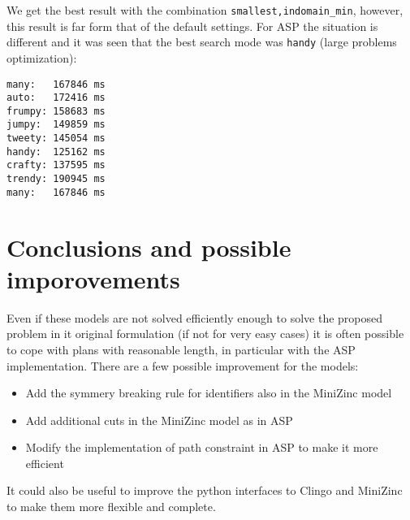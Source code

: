 \documentclass[11pt]{article}
\begin{document}
We get the best result with the combination \verb+smallest,indomain_min+, however, this result is far form that of the default settings.
For ASP the situation is different and it was seen that the best search mode was \verb+handy+ (large problems optimization):

\begin{verbatim}
many:	167846 ms
auto:	172416 ms
frumpy:	158683 ms
jumpy:	149859 ms
tweety:	145054 ms
handy:	125162 ms
crafty:	137595 ms
trendy:	190945 ms
many:	167846 ms
\end{verbatim}

\section{Conclusions and possible imporovements}

Even if these models are not solved efficiently enough to solve the proposed problem in it original formulation (if not for very easy cases) 
it is often possible to cope with plans with reasonable length, in particular with the ASP implementation. 
There are a few possible improvement for the models:

\begin{itemize}
\item Add the symmery breaking rule for identifiers also in the MiniZinc model
\item Add additional cuts in the MiniZinc model as in ASP
\item Modify the implementation of path constraint in ASP to make it more efficient 
\end{itemize} 

It could also be useful to improve the python interfaces to Clingo and MiniZinc to make them more flexible and complete.
\end{document}
